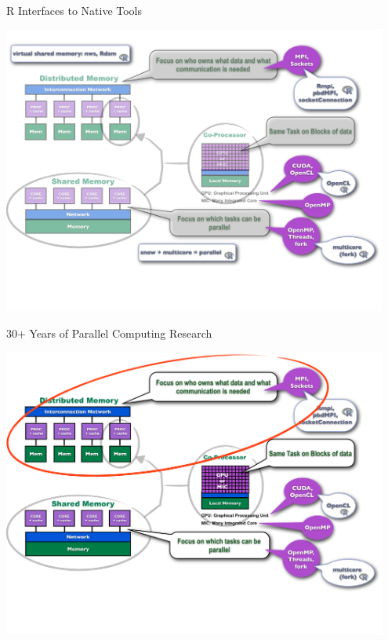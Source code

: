 \begin{frame}
\begin{block}{R Interfaces to Native Tools}
    
\includegraphics[width=0.95\textwidth]
{../common/pics/hardware/ParallelHardware7.pdf}
\end{block}
\end{frame}

\begin{frame}
\begin{block}{30+ Years of Parallel Computing Research}
    
\includegraphics[width=0.95\textwidth]
{../common/pics/hardware/ParallelHardware8.pdf}
\end{block}
\end{frame}


